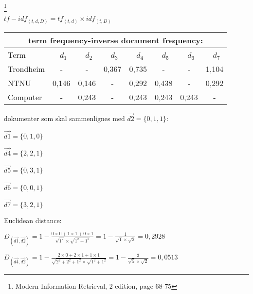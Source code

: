 \documentclass[]{article}
\begin{document}
\let\thefootnote\relax\footnote{Modern Information Retrieval, 2 edition, page 68-75}
\pagebreak


\begin{center}
$tf-idf_{(t,d,D)} = tf_{(t,d)} \times idf_{(t,D)}$
\vspace{5 mm}

\begin{tabular}[t]{|l|ccccccc|}

\multicolumn{8}{c}{term frequency-inverse document frequency:}\\\hline

Term&\ $d_1$&\ $d_2$&\ $d_3$&\ $d_4$&\ $d_5$&\ $d_6$&\ $d_7$\\\hline

Trondheim&-&-&0,367&0,735&-&-&1,104\\


NTNU&0,146&0,146&-&0,292&0,438&-&0,292\\

Computer&-&0,243&-&0,243&0,243&0,243&-\\\hline
\end{tabular}
\end{center}

\vspace{10 mm}
dokumenter som skal sammenlignes med $\overrightarrow{d2} = \{0,1,1\}$:
\vspace{2 mm}

\indent\indent$\overrightarrow{d1} = \{0,1,0\}$

\indent\indent$\overrightarrow{d4} = \{2,2,1\}$

\indent\indent$\overrightarrow{d5} = \{0,3,1\}$

\indent\indent$\overrightarrow{d6} = \{0,0,1\}$

\indent\indent$\overrightarrow{d7} = \{3,2,1\}$

\vspace{10 mm}

Euclidean distance:
\vspace{2 mm}
 	
$D_{(\overrightarrow{d1},\overrightarrow{d2})} = 1- \frac{0\times0+1\times1+0\times1}{\sqrt{1^2}\times\sqrt{1^2+1^2}} = 1 - \frac{1}{\sqrt{1}\times\sqrt{2}} = 0,2928$
\vspace{2 mm}

$D_{(\overrightarrow{d4},\overrightarrow{d2})} = 1 - \frac{2\times0+2\times1+1\times1}{\sqrt{2^2+2^2+1^2}\times\sqrt{1^2+1^2}} = 1 - \frac{3}{\sqrt{5}\times\sqrt{2}} = 0,0513$
\vspace{2 mm}
\end{document}
